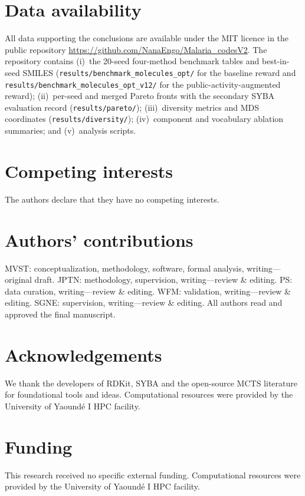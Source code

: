 \documentclass[10pt,a4paper]{article}
\begin{document}
\section*{Data availability}

All data supporting the conclusions are available under the MIT licence in the public repository \url{https://github.com/NanaEngo/Malaria_codesV2}. The repository contains (i)~the 20-seed four-method benchmark tables and best-in-seed SMILES (\texttt{results/benchmark\_molecules\_opt/} for the baseline reward and \texttt{results/benchmark\_molecules\_opt\_v12/} for the public-activity-augmented reward); (ii)~per-seed and merged Pareto fronts with the secondary SYBA evaluation record (\texttt{results/pareto/}); (iii)~diversity metrics and MDS coordinates (\texttt{results/diversity/}); (iv)~component and vocabulary ablation summaries; and (v)~analysis scripts.

\section*{Competing interests}
The authors declare that they have no competing interests.

\section*{Authors' contributions}
MVST: conceptualization, methodology, software, formal analysis, writing---original draft. JPTN: methodology, supervision, writing---review \& editing. PS: data curation, writing---review \& editing. WFM: validation, writing---review \& editing. SGNE: supervision, writing---review \& editing. All authors read and approved the final manuscript.

\section*{Acknowledgements}
We thank the developers of RDKit, SYBA and the open-source MCTS literature for foundational tools and ideas. Computational resources were provided by the University of Yaound\'{e} I HPC facility.

\section*{Funding}
This research received no specific external funding. Computational resources were provided by the University of Yaound\'{e} I HPC facility.
\end{document}

